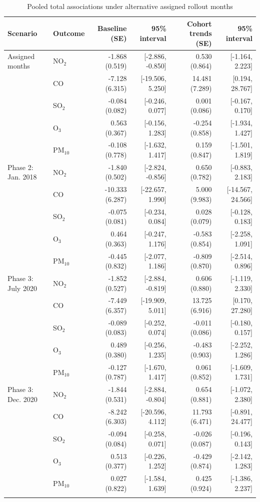\begin{longtable}{llrrrr}
\caption{Pooled total associations under alternative assigned rollout months}\label{tab:s_timing}\\
\toprule
Scenario & Outcome & Baseline (SE) & 95\% interval & Cohort trends (SE) & 95\% interval\\
\midrule\endhead
Assigned months & NO$_2$ & -1.868 (0.519) & [-2.886, -0.850] & 0.530 (0.864) & [-1.164, 2.223] \\
 & CO & -7.128 (6.315) & [-19.506, 5.250] & 14.481 (7.289) & [0.194, 28.767] \\
 & SO$_2$ & -0.084 (0.082) & [-0.246, 0.077] & 0.001 (0.086) & [-0.167, 0.170] \\
 & O$_3$ & 0.563 (0.367) & [-0.156, 1.283] & -0.254 (0.858) & [-1.934, 1.427] \\
 & PM$_{10}$ & -0.108 (0.778) & [-1.632, 1.417] & 0.159 (0.847) & [-1.501, 1.819] \\
\addlinespace
Phase 2: Jan. 2018 & NO$_2$ & -1.840 (0.502) & [-2.824, -0.856] & 0.650 (0.782) & [-0.883, 2.183] \\
 & CO & -10.333 (6.287) & [-22.657, 1.990] & 5.000 (9.983) & [-14.567, 24.566] \\
 & SO$_2$ & -0.075 (0.081) & [-0.234, 0.084] & 0.028 (0.079) & [-0.128, 0.183] \\
 & O$_3$ & 0.464 (0.363) & [-0.247, 1.176] & -0.583 (0.854) & [-2.258, 1.091] \\
 & PM$_{10}$ & -0.445 (0.832) & [-2.077, 1.186] & -0.809 (0.870) & [-2.514, 0.896] \\
\addlinespace
Phase 3: July 2020 & NO$_2$ & -1.852 (0.527) & [-2.884, -0.819] & 0.606 (0.880) & [-1.119, 2.330] \\
 & CO & -7.449 (6.357) & [-19.909, 5.011] & 13.725 (6.916) & [0.170, 27.280] \\
 & SO$_2$ & -0.089 (0.083) & [-0.252, 0.074] & -0.011 (0.086) & [-0.180, 0.157] \\
 & O$_3$ & 0.489 (0.380) & [-0.256, 1.235] & -0.483 (0.903) & [-2.252, 1.286] \\
 & PM$_{10}$ & -0.127 (0.787) & [-1.670, 1.417] & 0.061 (0.852) & [-1.609, 1.731] \\
\addlinespace
Phase 3: Dec. 2020 & NO$_2$ & -1.844 (0.531) & [-2.884, -0.804] & 0.654 (0.881) & [-1.072, 2.380] \\
 & CO & -8.242 (6.303) & [-20.596, 4.112] & 11.793 (6.471) & [-0.891, 24.477] \\
 & SO$_2$ & -0.094 (0.084) & [-0.258, 0.071] & -0.026 (0.087) & [-0.196, 0.143] \\
 & O$_3$ & 0.513 (0.377) & [-0.226, 1.252] & -0.429 (0.874) & [-2.142, 1.283] \\
 & PM$_{10}$ & 0.027 (0.822) & [-1.584, 1.639] & 0.425 (0.924) & [-1.386, 2.237] \\
\addlinespace
\bottomrule
\end{longtable}
